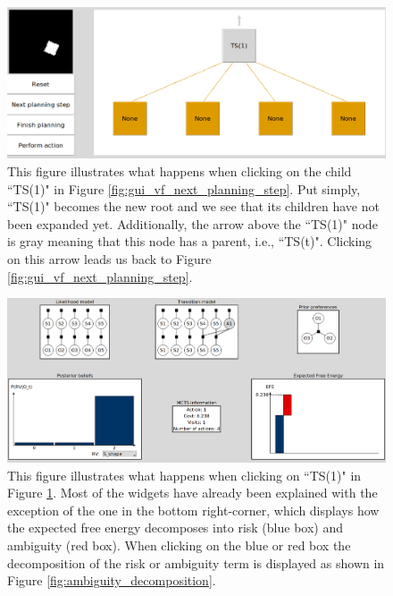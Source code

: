 \documentclass[twoside,11pt]{article}
\begin{document}
\begin{figure}[H]
	\begin{center}
	\includegraphics[scale=0.4]{navigating_to_child_node}
	\end{center}
  \caption{This figure illustrates what happens when clicking on the child ``TS(1)" in Figure \ref{fig:gui_vf_next_planning_step}. Put simply, ``TS(1)" becomes the new root and we see that its children have not been expanded yet. Additionally, the arrow above the ``TS(1)" node is gray meaning that this node has a parent, i.e., ``TS(t)". Clicking on this arrow leads us back to Figure \ref{fig:gui_vf_next_planning_step}.}
   \label{fig:navigating_to_child}
\end{figure}

\begin{figure}[H]
	\begin{center}
	\includegraphics[scale=0.3]{ts_frame_in_the_future.png}
	\end{center}
  \caption{This figure illustrates what happens when clicking on ``TS(1)" in Figure \ref{fig:navigating_to_child}. Most of the widgets have already been explained with the exception of the one in the bottom right-corner, which displays how the expected free energy decomposes into risk (blue box) and ambiguity (red box). When clicking on the blue or red box the decomposition of the risk or ambiguity term is displayed as shown in Figure \ref{fig:ambiguity_decomposition}.}
   \label{fig:ts_frame_in_the_future}
\end{figure}
\end{document}
